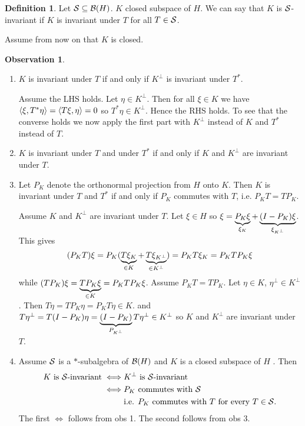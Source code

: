 \documentclass[10pt,english,a4paper]{article}
\theoremstyle{definition}
\newtheorem*{definition}{Definition}
\newtheorem*{observation}{Observation}
\begin{document}
\begin{definition}
    Let $\mathcal{S}\subseteq \mathcal{B}(H)$. $K$ closed subspace of $H$. We can say that 
$K$ is $\mathcal{S}$-invariant if $K$ is invariant under $T$ for all $T \in \mathcal{S}$.
\end{definition}

Assume from now on that $K$ is closed.
\begin{observation}
\leavevmode
\begin{enumerate}[(1)]
    \item 
$K$ is invariant under $T$ if and only if $K^{\perp}$ is invariant under $T^*$.
\medskip

Assume the LHS holds. Let $\eta\in K^{\perp}$. Then for all $\xi \in K$ we have 
$\left\langle \xi,T^*\eta \right\rangle=\left\langle T\xi,\eta \right\rangle = 0$ so $T^*\eta \in K^{\perp}$. Hence the 
RHS holds. To see that the converse holds we now apply the first part with 
$K^{\perp}$ instead of $K$ and $T^*$ instead of $T$.

\item $K$ is invariant under $T$ and under $T^*$ if and only if $K$ and
$K^{\perp}$ are invariant under $T$.

\item
Let $P_{K}$ denote the orthonormal projection from $H$ onto $K$. Then
$K$ is invariant under $T$ and $T^*$ if and only if $P_K$ commutes with $T$, i.e.
$P_KT=TP_K$.
\medskip

Assume $K$ and $K^{\perp}$ are invariant under $T$. Let $\xi \in H$ so 
$\xi = \underbrace{P_K\xi}_{\xi_{K}} + \underbrace{(I-P_{K})\xi}_{\xi_{K^{\perp}}}$. 
This gives 
\[
(P_KT)\xi = P_K (\underbrace{T\xi_{K}}_{\in K} + \underbrace{T\xi_{K^{\perp}}}_{\in K^{\perp}})
= P_KT\xi_{K}= P_KTP_K\xi
\]
while 
$(TP_K)\xi = \underbrace{TP_K \xi}_{\in K} = P_KTP_K\xi$. 
Assume $P_KT = TP_K$. Let $\eta \in K$, $\eta^{\perp}\in K^{\perp}$. 
Then $T\eta = TP_K \eta = P_KT\eta \in K$. and 
$T\eta^{\perp} = T(I-P_K)\eta = \underbrace{(I-P_K)}_{P_{K^\perp}} T\eta^{\perp} \in K^{\perp}$
so $K$ and $K^{\perp}$ are invariant under $T$.

\item
Assume $\mathcal{S}$ is a $*$-subalgebra of $\mathcal{B}(H)$ and $K$ is a closed subspace
of $H$ . Then 
\begin{align*}
K \text{ is } \mathcal{S}\text{-invariant} \iff& \text{$K^{\perp}$ is $\mathcal{S}$-invariant} \\
\iff& \text{$P_K$ commutes with $\mathcal{S}$} \\
  &\text{i.e. $P_K$ commutes with $T$ for every $T \in \mathcal{S}$.}
\end{align*}
The first $\iff$ follows from obs 1. The second follows from obs 3.

\end{enumerate}

\end{observation}
\end{document}
